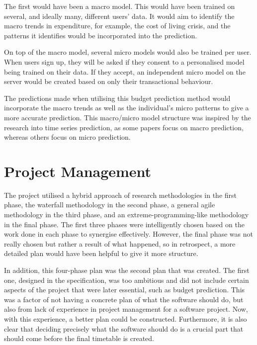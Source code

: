 The first would have been a macro model. This would have been trained on several, and ideally many, different users' data. It would aim to identify the macro trends in expenditure, for example, the cost of living crisis, and the patterns it identifies would be incorporated into the prediction.

On top of the macro model, several micro models would also be trained per user. When users sign up, they will be asked if they consent to a personalised model being trained on their data. If they accept, an independent micro model on the server would be created based on only their transactional behaviour.

The predictions made when utilising this budget prediction method would incorporate the macro trends as well as the individual's micro patterns to give a more accurate prediction. This macro/micro model structure was inspired by the research into time series prediction, as some papers focus on macro prediction, whereas others focus on micro prediction.

\section{Project Management}
The project utilised a hybrid approach of research methodologies in the first phase, the waterfall methodology in the second phase, a general agile methodology in the third phase, and an extreme-programming-like methodology in the final phase. The first three phases were intelligently chosen based on the work done in each phase to synergise effectively. However, the final phase was not really chosen but rather a result of what happened, so in retrospect, a more detailed plan would have been helpful to give it more structure.

In addition, this four-phase plan was the second plan that was created. The first one, designed in the specification, was too ambitious and did not include certain aspects of the project that were later essential, such as budget prediction. This was a factor of not having a concrete plan of what the software should do, but also from lack of experience in project management for a software project. Now, with this experience, a better plan could be constructed. Furthermore, it is also clear that deciding precisely what the software should do is a crucial part that should come before the final timetable is created.